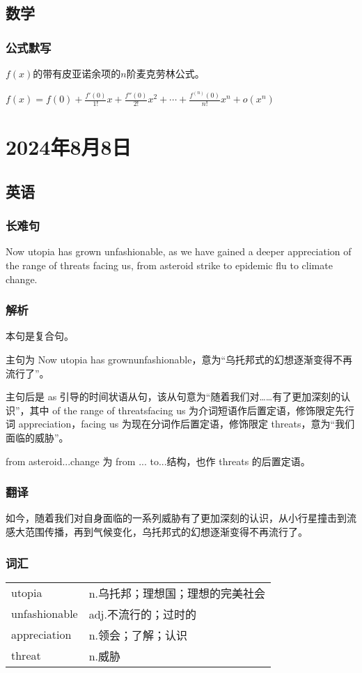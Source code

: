 \documentclass[UTF8]{ctexart}
\begin{document}
\subsection{数学}
\subsubsection{公式默写}
$f(x)$的带有皮亚诺余项的$n$阶麦克劳林公式。

$f(x)=f(0)+\frac{f'(0)}{1!}x+\frac{f''(0)}{2!}x^2+\cdots+\frac{f^{(n)}(0)}{n!}x^n+o(x^n)$
\section{2024年8月8日}
\subsection{英语}
\subsubsection{长难句}
Now utopia has grown unfashionable, as we have gained a deeper appreciation of the range of threats facing us, from asteroid strike to epidemic flu to climate change.
\subsubsection{解析}
本句是复合句。

主句为 Now utopia has grownunfashionable，意为“乌托邦式的幻想逐渐变得不再流行了”。

主句后是 as 引导的时间状语从句，该从句意为“随着我们对……有了更加深刻的认识”，其中 of the range of threatsfacing us 为介词短语作后置定语，修饰限定先行词 appreciation，facing us 为现在分词作后置定语，修饰限定 threats，意为“我们面临的威胁”。

from asteroid...change 为 from ... to...结构，也作 threats 的后置定语。
\subsubsection{翻译}
如今，随着我们对自身面临的一系列威胁有了更加深刻的认识，从小行星撞击到流感大范围传播，再到气候变化，乌托邦式的幻想逐渐变得不再流行了。
\newpage
\subsubsection{词汇}
\begin{table}[h]
      \centering
      \begin{tabular}{p{}p{}}
            utopia        & n.乌托邦；理想国；理想的完美社会 \\
            unfashionable & adj.不流行的；过时的      \\
            appreciation  & n.领会；了解；认识        \\
            threat        & n.威胁
      \end{tabular}
\end{table}
\end{document}
